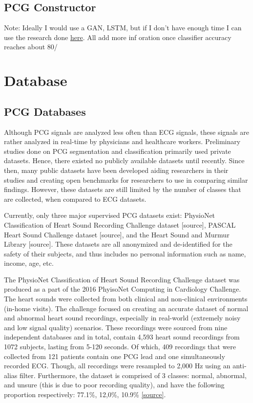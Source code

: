 \documentclass{article}
\begin{document}
\subsection{PCG Constructor}
Note: Ideally I would use a GAN, LSTM, but if I don't have enough time I can use the research done \href{https://www.sciencedirect.com/science/article/abs/pii/S1746809413000037}{here}. All add more inf oration once classifier accuracy reaches about 80/%

\section{Database}
\subsection{PCG Databases}
Although PCG signals are analyzed less often than ECG signals, these signals are rather analyzed in real-time by physicians and healthcare workers. Preliminary studies done on PCG segmentation and classification primarily used private datasets. Hence, there existed no publicly available datasets until recently. Since then, many public datasets have been developed aiding researchers in their studies and creating open benchmarks for researchers to use in comparing similar findings. However, these datasets are still limited by the number of classes that are collected, when compared to ECG datasets.

Currently, only three major supervised PCG datasets exist: PhysioNet Classification of Heart Sound Recording Challenge dataset [source], PASCAL Heart Sound Challenge dataset [source], and the Heart Sound and Murmur Library [source].  These datasets are all anonymized and de-identified for the safety of their subjects, and thus includes no personal information such as name, income, age, etc.

The PhysioNet Classification of Heart Sound Recording Challenge dataset was produced as a part of the 2016 PhyisoNet Computing in Cardiology Challenge. The heart sounds were collected from both clinical and non-clinical environments (in-home visits). The challenge focused on creating an accurate dataset of normal and abnormal heart sound recordings, especially in real-world (extremely noisy and low signal quality) scenarios. These recordings were sourced from nine independent databases and in total, contain 4,593 heart sound recordings from 1072 subjects, lasting from 5-120 seconds. Of which, 409 recordings that were collected from 121 patients contain one PCG lead and one simultaneously recorded ECG. Though, all recordings were resampled to 2,000 Hz using an anti-alias filter. Furthermore, the dataset is comprised of 3 classes: normal, abnormal, and unsure (this is due to poor recording quality), and have the following proportion respectively: 77.1\%, 12,0\%, 10.9\%  \href{https://www.ncbi.nlm.nih.gov/pmc/articles/PMC7199391/pdf/nihms-1005138.pdf}{[source]}. 
\end{document}
